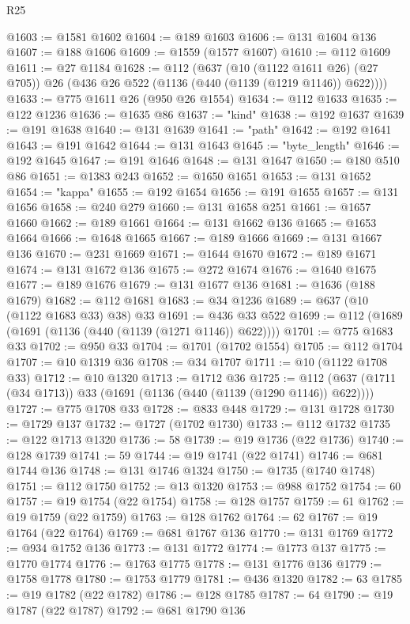 \begin{lexlean}{R25}
\begin{coremodule}
@1603 := @1581 @1602
@1604 := @189 @1603
@1606 := @131 @1604 @136
@1607 := @188 @1606
@1609 := @1559 (@1577 @1607)
@1610 := @112 @1609
@1611 := @27 @1184
@1628 := @112
    (@637
      (@10 (@1122 @1611 @26) (@27 @705))
      @26
      (@436 @26 @522 (@1136 (@440 (@1139 (@1219 @1146)) @622))))
@1633 := @775 @1611 @26 (@950 @26 @1554)
@1634 := @112 @1633
@1635 := @122 @1236
@1636 := @1635 @86
@1637 := "kind"
@1638 := @192 @1637
@1639 := @191 @1638
@1640 := @131 @1639
@1641 := "path"
@1642 := @192 @1641
@1643 := @191 @1642
@1644 := @131 @1643
@1645 := "byte_length"
@1646 := @192 @1645
@1647 := @191 @1646
@1648 := @131 @1647
@1650 := @180 @510 @86
@1651 := @1383 @243
@1652 := @1650 @1651
@1653 := @131 @1652
@1654 := "kappa"
@1655 := @192 @1654
@1656 := @191 @1655
@1657 := @131 @1656
@1658 := @240 @279
@1660 := @131 @1658 @251
@1661 := @1657 @1660
@1662 := @189 @1661
@1664 := @131 @1662 @136
@1665 := @1653 @1664
@1666 := @1648 @1665
@1667 := @189 @1666
@1669 := @131 @1667 @136
@1670 := @231 @1669
@1671 := @1644 @1670
@1672 := @189 @1671
@1674 := @131 @1672 @136
@1675 := @272 @1674
@1676 := @1640 @1675
@1677 := @189 @1676
@1679 := @131 @1677 @136
@1681 := @1636 (@188 @1679)
@1682 := @112 @1681
@1683 := @34 @1236
@1689 := @637 (@10 (@1122 @1683 @33) @38) @33
@1691 := @436 @33 @522
@1699 := @112 (@1689 (@1691 (@1136 (@440 (@1139 (@1271 @1146)) @622))))
@1701 := @775 @1683 @33
@1702 := @950 @33
@1704 := @1701 (@1702 @1554)
@1705 := @112 @1704
@1707 := @10 @1319 @36
@1708 := @34 @1707
@1711 := @10 (@1122 @1708 @33)
@1712 := @10 @1320
@1713 := @1712 @36
@1725 := @112 (@637 (@1711 (@34 @1713)) @33 (@1691 (@1136 (@440 (@1139 (@1290 @1146)) @622))))
@1727 := @775 @1708 @33
@1728 := @833 @448
@1729 := @131 @1728
@1730 := @1729 @137
@1732 := @1727 (@1702 @1730)
@1733 := @112 @1732
@1735 := @122 @1713 @1320
@1736 := 58
@1739 := @19 @1736 (@22 @1736)
@1740 := @128 @1739
@1741 := 59
@1744 := @19 @1741 (@22 @1741)
@1746 := @681 @1744 @136
@1748 := @131 @1746 @1324
@1750 := @1735 (@1740 @1748)
@1751 := @112 @1750
@1752 := @13 @1320
@1753 := @988 @1752
@1754 := 60
@1757 := @19 @1754 (@22 @1754)
@1758 := @128 @1757
@1759 := 61
@1762 := @19 @1759 (@22 @1759)
@1763 := @128 @1762
@1764 := 62
@1767 := @19 @1764 (@22 @1764)
@1769 := @681 @1767 @136
@1770 := @131 @1769
@1772 := @934 @1752 @136
@1773 := @131 @1772
@1774 := @1773 @137
@1775 := @1770 @1774
@1776 := @1763 @1775
@1778 := @131 @1776 @136
@1779 := @1758 @1778
@1780 := @1753 @1779
@1781 := @436 @1320
@1782 := 63
@1785 := @19 @1782 (@22 @1782)
@1786 := @128 @1785
@1787 := 64
@1790 := @19 @1787 (@22 @1787)
@1792 := @681 @1790 @136

\end{coremodule}
\end{lexlean}
